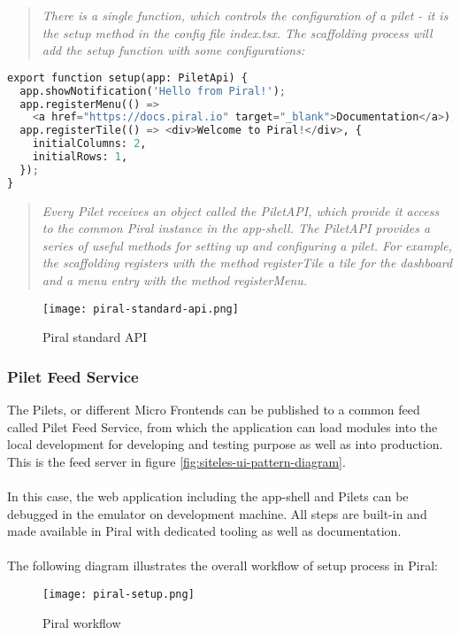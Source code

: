 \documentclass[a4paper]{book}
\begin{document}
\begin{quote}
\textit{There is a single function, which controls the configuration of a pilet - it is the setup method in the config file index.tsx. The scaffolding process will add the setup function with some configurations:} \cite{PiralGettingStarted}
\end{quote}
\begin{lstlisting}[language=Python]
export function setup(app: PiletApi) {
  app.showNotification('Hello from Piral!');
  app.registerMenu(() =>
    <a href="https://docs.piral.io" target="_blank">Documentation</a>);
  app.registerTile(() => <div>Welcome to Piral!</div>, {
    initialColumns: 2,
    initialRows: 1,
  });
}
\end{lstlisting}
\begin{quote}
\textit{Every Pilet receives an object called the PiletAPI, which provide it access to the common Piral instance in the app-shell. The PiletAPI provides a series of useful methods for setting up and configuring a pilet. For example, the scaffolding registers with the method registerTile a tile for the dashboard and a menu entry with the method registerMenu.} \cite{PiralGettingStarted}
\end{quote}
\begin{figure}[h!]
  \centering
  \captionsetup{justification=centering}
  \texttt{[image: piral-standard-api.png]}
  \caption{Piral standard API \cite{PiralGettingStarted}}
  \label{fig:piral-standard}
\end{figure}

\subsubsection{Pilet Feed Service}

The Pilets, or different Micro Frontends can be published to a common feed called Pilet Feed Service, from which the application can load modules into the local development for developing and testing purpose as well as into production. This is the feed server in figure \ref{fig:siteles-ui-pattern-diagram}.
\\ \\
In this case, the web application including the app-shell and Pilets can be debugged in the emulator on development machine. All steps are built-in and made available in Piral with dedicated tooling as well as documentation.
\\ \\
The following diagram illustrates the overall workflow of setup process in Piral:
\clearpage
\begin{figure}[h!]
  \centering
  \captionsetup{justification=centering}
  \texttt{[image: piral-setup.png]}
  \caption{Piral workflow \cite{PiralGettingStarted}}
  \label{fig:piral-setup}
\end{figure}
\end{document}
